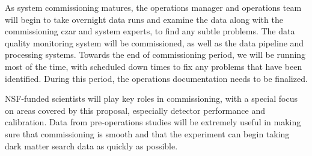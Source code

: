 As system commissioning matures, the operations manager and operations team will begin to take overnight data runs and examine the data along with the commissioning czar and system experts, to find any subtle problems. The data quality monitoring system will be commissioned, as well as the data pipeline and processing systems. Towards the end of commissioning period, we will be running most of the time, with scheduled down times to fix any problems that have been identified. During this period, the operations documentation needs to be finalized.  

NSF-funded scientists will play key roles in commissioning, with a special focus on areas covered by this proposal, especially detector performance and  calibration.  Data from pre-operations studies will be extremely useful in making sure that commissioning is smooth and that the experiment can begin taking dark matter search data as quickly as possible.
